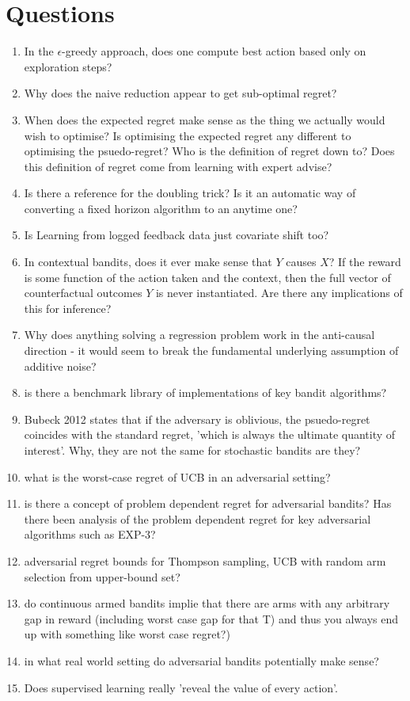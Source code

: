 \section{Questions}
\begin{enumerate}
\item In the $\epsilon$-greedy approach, does one compute best action based only on exploration steps?
\item Why does the naive reduction appear to get sub-optimal regret?
\item When does the expected regret make sense as the thing we actually would wish to optimise? Is optimising the expected regret any different to optimising the psuedo-regret? Who is the definition of regret down to? Does this definition of regret come from learning with expert advise?
\item Is there a reference for the doubling trick? Is it an automatic way of converting a fixed horizon algorithm to an anytime one?
\item Is Learning from logged feedback data just covariate shift too?
\item In contextual bandits, does it ever make sense that $Y$ causes $X$? If the reward is some function of the action taken and the context, then the full vector of counterfactual outcomes $Y$ is never instantiated. Are there any implications of this for inference?
\item Why does anything solving a regression problem work in the anti-causal direction - it would seem to break the fundamental underlying assumption of additive noise?
\item is there a benchmark library of implementations of key bandit algorithms?
\item Bubeck 2012 states that if the adversary is oblivious, the psuedo-regret coincides with the standard regret, 'which is always the ultimate quantity of interest'. Why, they are not the same for stochastic bandits are they?
\item what is the worst-case regret of UCB in an adversarial setting?
\item is there a concept of problem dependent regret for adversarial bandits? Has there been analysis of the problem dependent regret for key adversarial algorithms such as EXP-3?
\item adversarial regret bounds for Thompson sampling, UCB with random arm selection from upper-bound set?
\item do continuous armed bandits implie that there are arms with any arbitrary gap in reward (including worst case gap for that T) and thus you always end up with something like worst case regret?)
\item in what real world setting do adversarial bandits potentially make sense?
\item Does supervised learning really 'reveal the value of every action'.
\end{enumerate}


